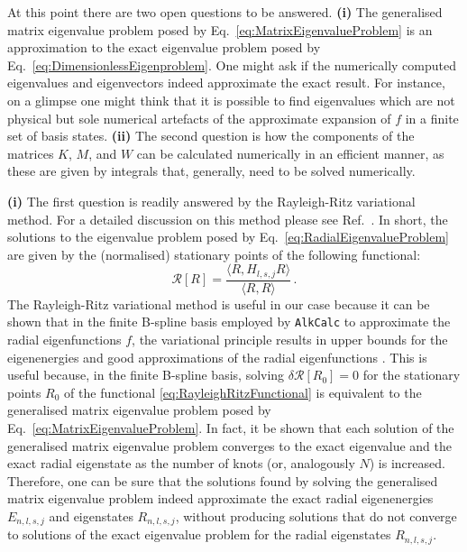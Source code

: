 \documentclass[fontsize=12pt,
               twoside=false,
               BCOR=0mm,
               DIV=14,
               overfullrule=false, %
               toc=bibliography,
               headinclude=true,
               footinclude=false]{scrartcl}
\numberwithin{equation}{section}
\newcommand{\alkcalc}{\texttt{AlkCalc} }
\begin{document}
    At this point there are two open questions to be answered. \textbf{(i)} The
    generalised matrix eigenvalue problem posed by
    Eq.~\eqref{eq:MatrixEigenvalueProblem} is an approximation to the exact
    eigenvalue problem posed by Eq.~\eqref{eq:DimensionlessEigenproblem}. One
    might ask if the numerically computed eigenvalues and eigenvectors indeed
    approximate the exact result. For instance, on a glimpse one might think
    that it is possible to find eigenvalues which are not physical but sole
    numerical artefacts of the approximate expansion of $f$ in a finite set of
    basis states. \textbf{(ii)} The second question is how the components of the
    matrices $K$, $M$, and $W$ can be calculated numerically in an efficient
    manner, as these are given by integrals that, generally, need to be solved
    numerically.

    \bigskip

    \noindent \textbf{(i)} The first question is readily answered by the
    Rayleigh-Ritz variational method. For a detailed discussion on this method
    please see Ref.~\cite{friedrich2017}. In short, the solutions to the
    eigenvalue problem posed by Eq.~\eqref{eq:RadialEigenvalueProblem} are given
    by the (normalised) stationary points of the following functional:
    \begin{equation}\label{eq:RayleighRitzFunctional}
        \mathcal{R}[R]
        =
        \frac{\langle R, H_{l,s,j} R \rangle}{\langle R, R \rangle}
    \,.
    \end{equation}
    The Rayleigh-Ritz variational method is useful in our case because it can be
    shown that in the finite B-spline basis employed by \alkcalc to approximate
    the radial eigenfunctions $f$, the variational principle results in upper
    bounds for the eigenenergies and good approximations of the radial
    eigenfunctions \cite{friedrich2017}. This is useful because, in the finite
    B-spline basis, solving $\delta{\mathcal{R}}[R_0]=0$ for the stationary
    points $R_0$ of the functional \eqref{eq:RayleighRitzFunctional} is
    equivalent to the generalised matrix eigenvalue problem posed by
    Eq.~\eqref{eq:MatrixEigenvalueProblem}. In fact, it be shown that each
    solution of the generalised matrix eigenvalue problem converges to the exact
    eigenvalue and the exact radial eigenstate as the number of knots (or,
    analogously $N$) is increased. Therefore, one can be sure that the solutions
    found by solving the generalised matrix eigenvalue problem indeed
    approximate the exact radial eigenenergies $E_{n,l,s,j}$ and eigenstates
    $R_{n,l,s,j}$, without producing solutions that do not converge to solutions
    of the exact eigenvalue problem for the radial eigenstates $R_{n,l,s,j}$.
\end{document}
